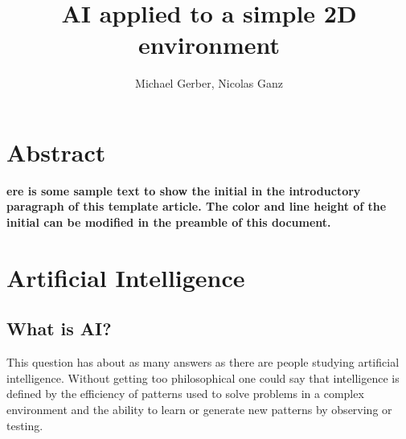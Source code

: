 %
%
%
%






\begin{titlepage}
  \thispagestyle{empty}

  \title{AI applied to a simple 2D environment} %
  \author{Michael Gerber, Nicolas Ganz } %
  \maketitle %
\end{titlepage}

\tableofcontents

\chapter{Abstract}
\textbf{ere is some sample text to show the initial in the introductory paragraph of this template article. The color and line height of the initial can be modified in the preamble of this document.}

\chapter{Artificial Intelligence}
\section{What is AI?}

This question has about as many answers as there are people studying artificial intelligence. Without getting too philosophical one could say that intelligence is defined by the efficiency of patterns used to solve problems in a complex environment and the ability to learn or generate new patterns by observing or testing.

